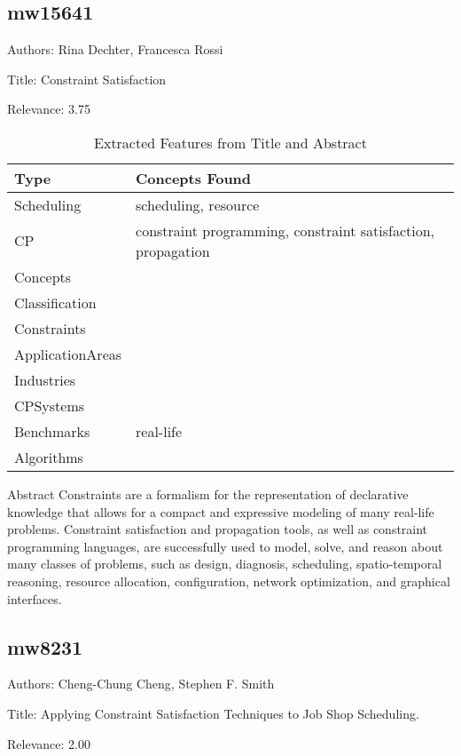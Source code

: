 \subsection{mw15641}
\label{mw:mw15641}

Authors: Rina Dechter, Francesca Rossi

Title: Constraint Satisfaction

Relevance:  3.75

{\scriptsize
\begin{longtable}{p{2cm}p{20cm}}
\caption{Extracted Features from Title and Abstract}\\ \toprule
Type & Concepts Found\\ \midrule
\endhead
\bottomrule
\endfoot
Scheduling & scheduling, resource\\ 
CP & constraint programming, constraint satisfaction, propagation\\ 
Concepts & \\ 
Classification & \\ 
Constraints & \\ 
ApplicationAreas & \\ 
Industries & \\ 
CPSystems & \\ 
Benchmarks & real-life\\ 
Algorithms & \\ 
\end{longtable}
}

 Abstract 
           Constraints are a formalism for the representation of declarative knowledge that allows for a compact and expressive modeling of many real‐life problems. Constraint satisfaction and propagation tools, as well as constraint programming languages, are successfully used to model, solve, and reason about many classes of problems, such as design, diagnosis, scheduling, spatio‐temporal reasoning, resource allocation, configuration, network optimization, and graphical interfaces. 

\subsection{mw8231}
\label{mw:mw8231}

Authors: Cheng-Chung Cheng, Stephen F. Smith

Title: Applying Constraint Satisfaction Techniques to Job Shop Scheduling.

Relevance:  2.00

